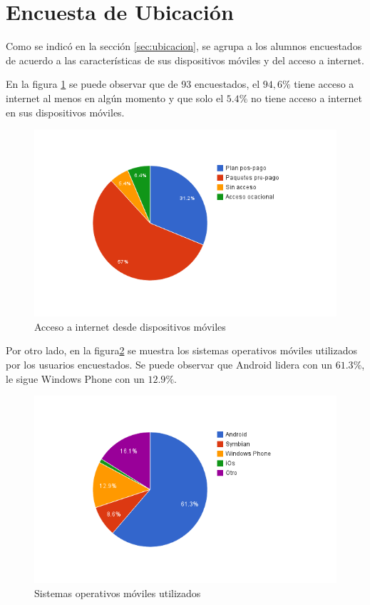

\section{Encuesta de Ubicación}
\label{sec:res_UBICACION}

Como se indicó en la sección \ref{sec:ubicacion}, se agrupa a los alumnos encuestados
de acuerdo a las características de sus dispositivos móviles y del acceso a internet.

En la figura \ref{fig:ubicacion_acceso_internet} se puede observar que de 93 encuestados, 
el $94,6\%$ tiene acceso a internet al menos en algún momento y que solo el $5.4\%$ no tiene
acceso a internet en sus dispositivos móviles.

\begin{figure}[ht!]
\centering
\includegraphics[scale=0.8]{resultados/imagenes/ubicacion_acceso_internet.png}
\caption{Acceso a internet desde dispositivos móviles}
\label{fig:ubicacion_acceso_internet}
\end{figure}

Por otro lado, en la figura\ref{fig:ubicacion_sistemas_operativos} se muestra los sistemas 
operativos móviles utilizados por los usuarios encuestados. Se puede observar que Android 
lidera con un $61.3\%$, le sigue Windows Phone con un $12.9\%$.

\begin{figure}[ht!]
\centering
\includegraphics[scale=0.8]{resultados/imagenes/ubicacion_sistemas_operativos.png}
\caption{Sistemas operativos móviles utilizados}
\label{fig:ubicacion_sistemas_operativos}
\end{figure}

